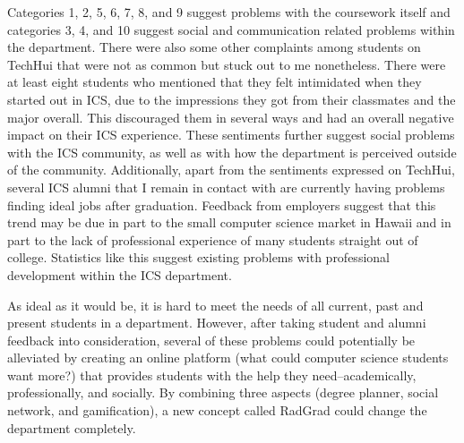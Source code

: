 Categories 1, 2, 5, 6, 7, 8, and 9 suggest problems with the coursework itself and categories 3, 4, and 10 suggest social and communication related problems within the department. There were also some other complaints among students on TechHui that were not as common but stuck out to me nonetheless. There were at least eight students who mentioned that they felt intimidated when they started out in ICS, due to the impressions they got from their classmates and the major overall. This discouraged them in several ways and had an overall negative impact on their ICS experience. These sentiments further suggest social problems with the ICS community, as well as with how the department is perceived outside of the community. Additionally, apart from the sentiments expressed on TechHui, several ICS alumni that I remain in contact with are currently having problems finding ideal jobs after graduation. Feedback from employers suggest that this trend may be due in part to the small computer science market in Hawaii and in part to the lack of professional experience of many students straight out of college. Statistics like this suggest existing problems with professional development within the ICS department. 

As ideal as it would be, it is hard to meet the needs of all current, past and present students in a department. However, after taking student and alumni feedback into consideration, several of these problems could potentially be alleviated by creating an online platform (what could computer science students want more?) that provides students with the help they need--academically, professionally, and socially. By combining three aspects (degree planner, social network, and gamification), a new concept called RadGrad could change the department completely. 

